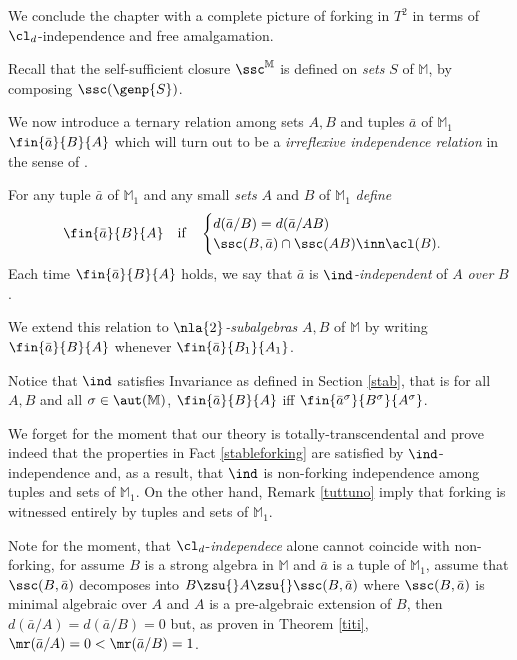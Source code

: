 We conclude the chapter with a complete picture of forking in $T^{2}$ in terms of $\cl_{d}$-independence and free amalgamation.

\smallskip
Recall that the self-sufficient closure $\ssc^{\mathbb{M}}$
is defined on {\em sets} $S$ of $\mathbb{M}$, by composing $\ssc(\genp{S})$.

We now introduce a ternary relation among sets $A,B$ and tuples $\bar a$ of $\mathbb{M}_{1}$ 
$\fin{\bar a}{B}{A}$ which will turn out to be a {\em irreflexive independence relation} in the sense of \cite{ad}.
\begin{dfn}\label{indepdef}
For any tuple $\bar a$ of $\mathbb{M}_{1}$ and any small {\em sets} $A$ and $B$ of $\mathbb{M}_{1}$ {\em define}
$$
\fin{\bar a}{B}{A}\quad\text{if}\quad
\begin{cases}
d(\bar a/B)=d(\bar a/AB)\\
\ssc(B,\bar a)\cap\ssc(AB)\inn\acl(B).%
\end{cases}
$$
Each time $\fin{\bar a}{B}{A}$ holds, we say that $\bar a$ is {\em $\ind$-independent}
of $A$ {\em over} $B$.

We extend this relation to {\em $\nla{2}$-subalgebras} $A,B$ of $\mathbb{M}$ by writing
$\fin{\bar a}{B}{A}$ whenever $\fin{\bar a}{B_{1}}{A_{1}}$.
\end{dfn}

Notice that  $\ind$ satisfies {\small\sc Invariance} as defined in Section \ref{stab}, that is
for all $A,B$ and all $\sigma\in\aut(\mathbb{M})$, $\fin{\bar a}{B}{A}$ iff $\fin{\bar a^{\sigma}}{B^{\sigma}}{A^{\sigma}}$.

We forget for the moment that our theory is totally-transcendental and
prove indeed that the properties in Fact \ref{stableforking} are satisfied by $\ind$-independence and,
as a result, that $\ind$ is non-forking independence among tuples and sets of $\mathbb{M}_{1}$.
On the other hand, Remark \ref{tuttuno} imply that forking is witnessed entirely by tuples and sets of $\mathbb{M}_{1}$.

\smallskip
Note for the moment, that $\cl_{d}$-{\em independece} alone cannot coincide with non-forking, for assume
$B$ is a strong algebra in $\mathbb{M}$ and $\bar a$ is a tuple of $\mathbb{M}_{1}$, assume that
$\ssc(B,\bar a)$ decomposes into $B\zsu{}A\zsu{}\ssc(B,\bar a)$ where
$\ssc(B,\bar a)$ is minimal algebraic over $A$ and $A$ is a pre-algebraic extension of $B$, then $d(\bar a/A)=d(\bar a/B)=0$
but, as proven in Theorem \ref{titi},  $\mr(\bar a/A)=0<\mr(\bar a/B)=1$.

